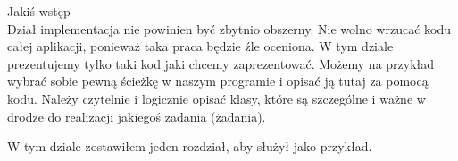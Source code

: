 Jakiś wstęp\\

Dział implementacja nie powinien być zbytnio obszerny. Nie wolno wrzucać kodu całej aplikacji, ponieważ taka praca będzie źle oceniona. W tym dziale prezentujemy tylko taki kod jaki chcemy zaprezentować. Możemy na przykład wybrać sobie pewną ścieżkę w naszym programie i opisać ją tutaj za pomocą kodu. Należy czytelnie i logicznie opisać klasy, które są szczególne i ważne w drodze do realizacji jakiegoś zadania (żadania).

W tym dziale zostawiłem jeden rozdział, aby służył jako przykład.